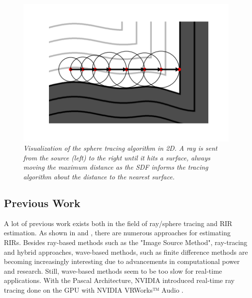 \documentclass[twoside,a4paper]{article}
\begin{document}
\begin{figure}[ht]
\centerline{\includegraphics[scale=0.5]{img/sphereTracingViz.png}}
\caption{\label{sphereViz}{\it Visualization of the sphere tracing algorithm in 2D. A ray is sent from the source (left) to the right until it hits a surface, always moving the maximum distance as the SDF informs the tracing algorithm about the distance to the nearest surface.}}
\end{figure}

\subsection{Previous Work}
\label{ssec:prev}
A lot of previous work exists both in the field of ray/sphere tracing and RIR estimation.
As shown in \cite{alpkocak_computing_2010} and \cite{brinkmann_round_2019}, there are numerous approaches for estimating RIRs. Besides ray-based methods such as the "Image Source Method", ray-tracing and hybrid approaches, wave-based methods, such as finite difference methods are becoming increasingly interesting due to advancements in computational power and research. Still, wave-based methods seem to be too slow for real-time applications. With the Pascal Architecture, NVIDIA introduced real-time ray tracing done on the GPU with NVIDIA VRWorks™ Audio \cite{noauthor_vrworks_nodate}.




\end{document}

